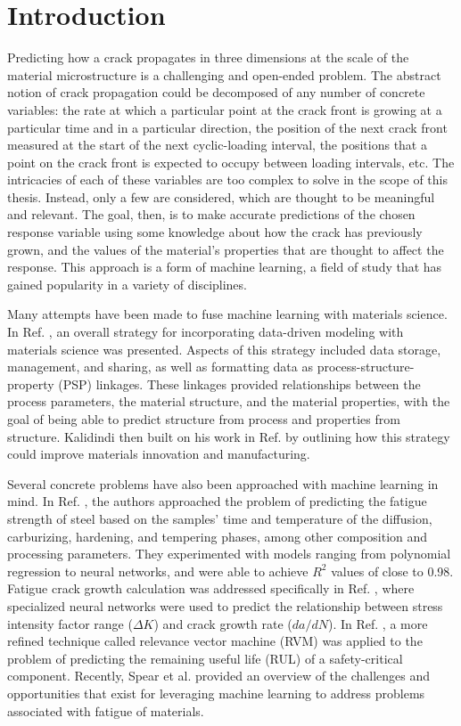 
\chapter{Introduction}

Predicting how a crack propagates in three dimensions at the scale of the material microstructure is a challenging and open-ended problem.  The abstract notion of crack propagation could be decomposed of any number of concrete variables: the rate at which a particular point at the crack front is growing at a particular time and in a particular direction, the position of the next crack front measured at the start of the next cyclic-loading interval, the positions that a point on the crack front is expected to occupy between loading intervals, etc.  The intricacies of each of these variables are too complex to solve in the scope of this thesis.  Instead, only a few are considered, which are thought to be meaningful and relevant.  The goal, then, is to make accurate predictions of the chosen response variable using some knowledge about how the crack has previously grown, and the values of the material's properties that are thought to affect the response.  This approach is a form of machine learning, a field of study that has gained popularity in a variety of disciplines.

Many attempts have been made to fuse machine learning with materials science.  In Ref. \cite{kalidindi2015}, an overall strategy for incorporating data-driven modeling with materials science was presented.  Aspects of this strategy included data storage, management, and sharing, as well as formatting data as process-structure-property (PSP) linkages.  These linkages provided relationships between the process parameters, the material structure, and the material properties, with the goal of being able to predict structure from process and properties from structure.  Kalidindi then built on his work in Ref. \cite{kalidindi2016} by outlining how this strategy could improve materials innovation and manufacturing.

Several concrete problems have also been approached with machine learning in mind.  In Ref. \cite{agrawal2014}, the authors approached the problem of predicting the fatigue strength of steel based on the samples' time and temperature of the diffusion, carburizing, hardening, and tempering phases, among other composition and processing parameters.  They experimented with models ranging from polynomial regression to neural networks, and were able to achieve $R^2$ values of close to 0.98.  Fatigue crack growth calculation was addressed specifically in Ref. \cite{wang2017}, where specialized neural networks were used to predict the relationship between stress intensity factor range ($\Delta K$) and crack growth rate ($da/dN$).  In Ref. \cite{zio2012}, a more refined technique called relevance vector machine (RVM) was applied to the problem of predicting the remaining useful life (RUL) of a safety-critical component.   Recently, Spear et al. \cite{spear2018} provided an overview of the challenges and opportunities that exist for leveraging machine learning to address problems associated with fatigue of materials.

